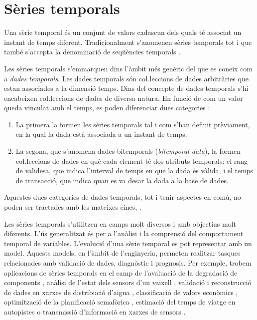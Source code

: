 

\section{Sèries temporals}
\label{sec:art:seriestemporals}



Una sèrie temporal és un conjunt de valors cadascun dels quals té
associat un instant de temps diferent.  Tradicionalment s'anomenen
sèries temporals tot i que també s'accepta la denominació de
seqüències temporals \parencite{last:hetland}.

Les sèries temporals s'emmarquen dins l'àmbit més genèric del que es
coneix com a \emph{dades temporals}. Les dades temporals són
co\l.leccions de dades arbitràries que estan associades a la dimensió
temps.  Dins del concepte de dades temporals s'hi encabeixen
co\l.leccions de dades de diversa natura. En funció de com un valor
queda vinculat amb el temps, es poden diferenciar dues
categories \parencite{assfalg08:thesis}:
\begin{enumerate}
\item La primera la formen les sèries temporals tal i com s'han
  definit prèviament, en la qual la dada està associada a un instant
  de temps.
\item La segona, que s'anomena dades bitemporals (\emph{bitemporal
    data}), la formen co\l.leccions de dades en què cada element té
  dos atributs temporals: el rang de validesa, que indica l'interval
  de temps en que la dada és vàlida, i el temps de transacció, que
  indica quan es va desar la dada a la base de dades.
\end{enumerate}
Aquestes dues categories de dades temporals, tot i tenir aspectes en
comú, no poden ser tractades amb les mateixes
eines, \parencite{schmidt95}.


Les sèries temporals s'utilitzen en camps molt diversos i amb
objectius molt diferents. L'ús generalitzat és per a l'anàlisi i la
comprensió del comportament temporal de variables. L'evolució d'una
sèrie temporal es pot representar amb un model. Aquests models, en
l'àmbit de l'enginyeria, permeten realitzar tasques relacionades amb
validació de dades, diagnòstic i prognosis.  Per exemple, trobem
aplicacions de sèries temporals en el camp de l'avaluació de la
degradació de components \parencite{yu11}, anàlisi de l'estat dels
sensors d'un vaixell \parencite{palmer07}, validació i reconstrucció
de dades en xarxes de distribució d'aigua \parencite{quevedo10},
classificació de valors econòmics \parencite{dreyer95}, optimització
de la planificació semafòrica \parencite{last11}, estimació del temps
de viatge en autopistes \parencite{soriguera10} o transmissió
d'informació en xarxes de
sensors \parencite{jainagrawal05,yaogehrke02}.


